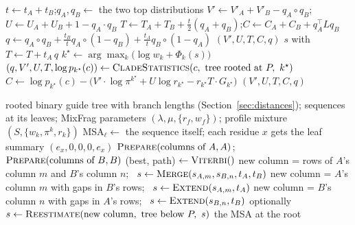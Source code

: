 \documentclass[11pt]{article}
\begin{document}
\begin{algorithm}[p]
\caption{Summaries of the parent MSA's columns}
\label{alg:newsum}
\begin{algorithmic}[1]
 
  \State $t\gets t_A+t_B$;\quad $q_A,q_B\gets$ the two top distributions
  \State $V'\gets V'_A+V'_B-q_A\circ q_B$;\quad $U\gets U_A+U_B+1-q_A\cdot q_B$
  \State $T\gets T_A+T_B+\tfrac t2(q_A+q_B)$;\quad $C\gets C_A+C_B+q_A^\top Lq_B$
  \State $q\gets q_A\circ q_B+\tfrac{t_B}{t}q_A\circ(1-q_B)+\tfrac{t_A}{t}q_B\circ(1-q_A)$
  \State \Return $(V',U,T,C,q)$
\EndFunction
{} 
  \State \Return $s$ with $T\gets T+t_A\,q$ 
\EndFunction
{}
  \State $k^\star\gets\arg\max_k\big(\log w_k+\Phi_k(s)\big)$ 
  \State $(q,V',U,T,\log p_{k^\star}(c))\gets\textsc{CladeStatistics}(c,\ \text{tree rooted at }P,\ k^\star)$
  \State $C\gets\log p_{k^\star}(c)-\big(V'\cdot\log\pi^{k^\star}+U\log r_{k^\star}
    -r_{k^\star}T\cdot G_{k^\star}\big)$
  \State \Return $(V',U,T,C,q)$ 
\EndFunction
\end{algorithmic}
\end{algorithm}

\begin{algorithm}[p]
\caption{Progressive alignment}
\label{alg:progressive}
\begin{algorithmic}[1]
\Require rooted binary guide tree with branch lengths (Section~\ref{sec:distances});
  sequences at its leaves;
  MixFrag parameters $(\lambda,\mu,\{r_f,w_f\})$; profile mixture $(S,\{w_k,\pi^k,r_k\})$
  \State MSA$_\ell\gets$ the sequence itself; each residue $x$ gets the leaf summary
    $(e_x,0,0,0,e_x)$
\EndFor
{}
  \State $\textsc{Prepare}(\text{columns of }A,A)$;\quad $\textsc{Prepare}(\text{columns of }B,B)$
  \State (best, path) $\gets\textsc{Viterbi}()$
      \State new column = rows of $A$'s column $m$ and $B$'s column $n$;
        \ $s\gets\textsc{Merge}(s_{A,m},s_{B,n},t_A,t_B)$
      \State new column = $A$'s column $m$ with gaps in $B$'s rows;
        \ $s\gets\textsc{Extend}(s_{A,m},t_A)$
    \Else {}
      \State new column = $B$'s column $n$ with gaps in $A$'s rows;
        \ $s\gets\textsc{Extend}(s_{B,n},t_B)$
    \EndIf
    \State optionally $s\gets\textsc{Reestimate}(\text{new column},\ \text{tree below }P,\ s)$
  \EndFor
\EndFor
\State \Return the MSA at the root
\end{algorithmic}
\end{algorithm}
\end{document}
